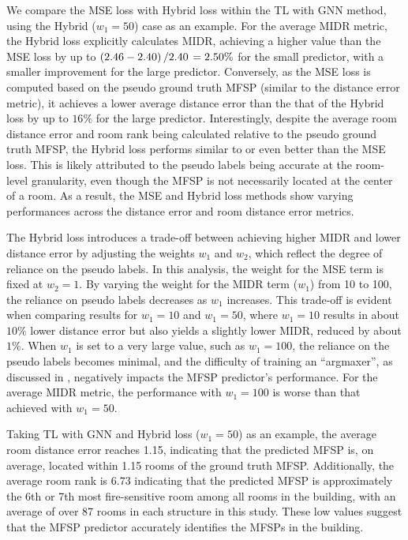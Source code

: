 We compare the MSE loss with Hybrid loss within the TL with GNN method, using the Hybrid ($w_1=50$) case as an example. For the average MIDR metric, the Hybrid loss explicitly calculates MIDR, achieving a higher value than the MSE loss by up to $(2.46-2.40)\left/2.40\right.=2.50\%$ for the small predictor, with a smaller improvement for the large predictor. Conversely, as the MSE loss is computed based on the pseudo ground truth MFSP (similar to the distance error metric), it achieves a lower average distance error than the that of the Hybrid loss by up to $16\%$ for the large predictor. Interestingly, despite the average room distance error and room rank being calculated relative to the pseudo ground truth MFSP, the Hybrid loss performs similar to or even better than the MSE loss. This is likely attributed to the pseudo labels being accurate at the room-level granularity, even though the MFSP is not necessarily located at the center of a room. As a result, the MSE and Hybrid loss methods show varying performances across the distance error and room distance error metrics.

The Hybrid loss introduces a trade-off between achieving higher MIDR and lower distance error by adjusting the weights $w_1$ and $w_2$, which reflect the degree of reliance on the pseudo labels. In this analysis, the weight for the MSE term is fixed at $w_2=1$. By varying the weight for the MIDR term ($w_1$) from 10 to 100, the reliance on pseudo labels decreases as $w_1$ increases. This trade-off is evident when comparing results for $w_1=10$ and $w_1=50$, where $w_1=10$ results in about $10\%$ lower distance error but also yields a slightly lower MIDR, reduced by about $1\%$. When $w_1$ is set to a very large value, such as $w_1=100$, the reliance on the pseudo labels becomes minimal, and the difficulty of training an ``argmaxer'', as discussed in , negatively impacts the MFSP predictor's performance. For the average MIDR metric, the performance with $w_1=100$ is worse than that achieved with $w_1=50$.

Taking TL with GNN and Hybrid loss ($w_1=50$) as an example, the average room distance error reaches 1.15, indicating that the predicted MFSP is, on average, located within 1.15 rooms of the ground truth MFSP. Additionally, the average room rank is $6.73$ indicating that the predicted MFSP is approximately the 6th or 7th most fire-sensitive room among all rooms in the building, with an average of over 87 rooms in each structure in this study. These low values suggest that the MFSP predictor accurately identifies the MFSPs in the building.

